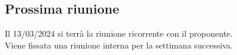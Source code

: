 \subsection{Prossima riunione} \label{subsec:riunione}
Il 13/03/2024 si terrà la riunione ricorrente con il proponente. \\ 
Viene fissata una riunione interna per la settimana successiva.